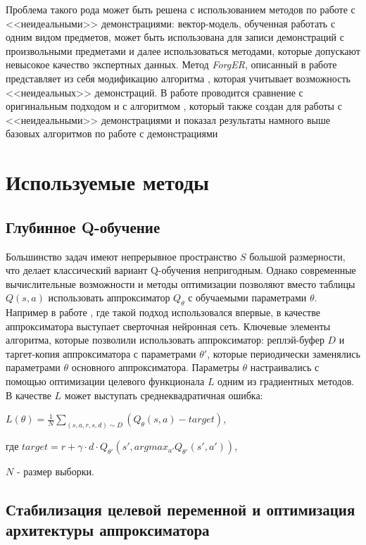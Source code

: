 \documentclass{mipt-thesis-bs}
\begin{document}
Проблема такого рода может быть решена с использованием методов по работе с <<неидеальными>> демонстрациями: вектор-модель, обученная работать с одним видом предметов, может быть использована для записи демонстраций с произвольными предметами и далее использоваться методами, которые допускают невысокое качество экспертных данных. Метод \textit{ForgER}, описанный в работе представляет из себя модификацию алгоритма \cite{dqfd}, которая учитывает возможность <<неидеальных>> демонстраций. В работе проводится сравнение с оригинальным подходом и с алгоритмом \cite{pofd}, который также создан для работы с <<неидеальными>> демонстрациями и показал результаты намного выше базовых алгоритмов по работе с демонстрациями \cite{gail, dqfd} 


\chapter{Используемые методы}
\section{Глубинное Q-обучение}

Большинство задач имеют непрерывное пространство $S$ большой размерности, что делает классический вариант Q-обучения непригодным. Однако современные вычислительные возможности и методы оптимизации позволяют вместо таблицы $Q(s,a)$ использовать аппроксиматор $Q_\theta$ с обучаемыми параметрами $\theta$. Например в работе \cite{dqn}, где такой подход использовался впервые, в качестве аппроксиматора выступает сверточная нейронная сеть. Ключевые элементы алгоритма, которые позволили использовать аппроксиматор: реплэй-буфер $D$ и таргет-копия аппроксиматора с параметрами $\theta'$, которые периодически заменялись параметрами $\theta$ основного аппроксиматора. Параметры $\theta$ настраивались с помощью оптимизации  целевого функционала $L$ одним из градиентных методов. В качестве $L$ может выступать среднеквадратичная ошибка:

\begin{center}
    
$L(\theta)=\frac{1}{N}\sum_{(s,a,r,s,d) \sim D} (Q_\theta(s, a) - target)$,

где $target = r + \gamma\cdot d \cdot Q_{\theta'}(s',argmax_{a'}Q_{\theta'}(s',a'))$,

$N$ - размер выборки.
\end{center}

\section{Стабилизация целевой переменной и оптимизация архитектуры аппроксиматора}
\end{document}
